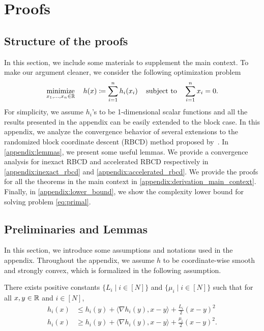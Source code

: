 \section{Proofs}

\subsection{Structure of the proofs}

In this section, we include some materials to supplement the main context. To make our argument cleaner, we consider the following optimization problem 
\begin{align}
    \displaystyle\mathop{\hbox{\rm minimize}}_{x_1, \dots, x_n \in \mathbb{R}}\enspace\enspace h(x) \coloneqq \sum_{i=1}^n h_i(x_i) \enspace\enspace\mathop{\hbox{\rm subject to}}\enspace\enspace \sum_{i=1}^n x_i = 0 \label{eq:CDObj}.
\end{align}
For simplicity, we assume $h_i$'s to be 1-dimensional scalar functions and all the results presented in the appendix can be easily extended to the block case. In this appendix, we analyze the convergence behavior of several extensions to the randomized block coordinate descent (RBCD) method proposed by~\citet{necoara2017random}. In \autoref{appendix:lemmas}, we present some useful lemmas. We provide a convergence analysis for inexact RBCD and accelerated RBCD respectively in \autoref{appendix:inexact_rbcd} and \autoref{appendix:accelerated_rbcd}. We provide the proofs for all the theorems in the main context in \autoref{appendix:derivation_main_context}. Finally, in \autoref{appendix:lower_bound}, we show the complexity lower bound for solving problem \eqref{eq:primal}. 

\subsection{Preliminaries and Lemmas} \label{appendix:lemmas}
In this section, we introduce some assumptions and notations used in the appendix. 
Throughout the appendix, we assume $h$ to be coordinate-wise smooth and strongly convex, which is formalized in the following assumption. 
\begin{assumption} \label{ass:hStruncture} 
  There exists positive constants $\{L_i \mid i \in [N]\}$ and $\{\mu_i \mid i \in [N]\}$ such that for all $x,y \in \mathbb{R}$ and $i \in [N]$, 
  \begin{align}
      h_i(x) &\leq h_i(y) + \langle \nabla h_i(y), x - y \rangle + \frac{L_i}{2} (x - y)^2 \tag{smoothnes}
      \\ h_i(x) &\geq h_i(y) + \langle \nabla h_i(y), x - y \rangle + \frac{\mu_i}{2} (x - y)^2 \tag{strong convexity}.
  \end{align}
\end{assumption}

